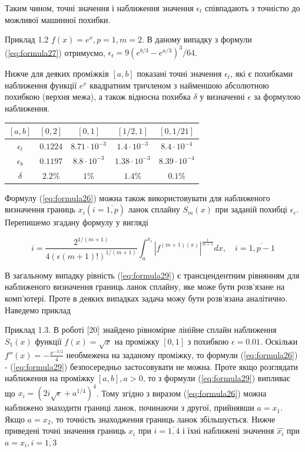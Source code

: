 \documentclass[ukrainian,14pt]{extarticle}
\begin{document}
Таким чином, точні значення і наближення значення $\epsilon_t$ співпадають з точністю до можливої машинної похибки.

\vspace{1cm}

Приклад 1.2 $f(x) = e^x, p = 1, m = 2$. В даному випадку з формули (\ref{eq:formula27}) отримуємо, $\epsilon_t = 9 (e^{b/3} - e^{a/3})^3 / 64$.

Нижче для деяких проміжків $[a, b]$ показані точні значення $\epsilon_t$, які є похибками наближення функції $e^x$ квадратним тричленом з найменшою абсолютною похибкою (верхня межа), а також відносна похибка $\delta$ у визначенні $\epsilon$ за формулою наближення.

\bgroup
\def\arraystretch{1.5}%
\begin{center}
\begin{tabular}{ c | c |
c | c | c }
 $[a, b]$ & $[0,2]$ & $[0,1]$ & $[1/2,1]$ & $[0,1/21]$ \\
 \hline
 $\epsilon_t$ & $0.1224$ & $8.71 \cdot 10^{-3}$ & $1.4 \cdot 10^{-3}$ & $8.4 \cdot 10^{-4}$ \\  
 \hline
  $\epsilon_b$ & $0.1197$ & $8.8 \cdot 10^{-3}$ & $1.38 \cdot 10^{-3}$ & $8.39 \cdot 10^{-4}$\\  
 \hline
 $\delta$ & $2.2\%$ & $1\%$ & $1.4\%$ & $0.1\%$    
\end{tabular}
\end{center}
\egroup

Формулу (\ref{eq:formula26}) можна також використовувати для наближеного визначення границь $x_i (i = \overline{1,p})$ ланок сплайну $S_m(x)$ при заданій похибці $\epsilon_c$. Перепишемо згадану формулу у вигляді

\begin{equation}\label{eq:formula29}
    i = \frac{2^{1/(m+1)}}{4(\epsilon (m+1)!)^{1/(m+1)}} \int_a^{x_i} \left| f^{(m+1) (x)} \right|^{\frac{1}{m+1}} dx, \quad i = \overline{1, p-1}
\end{equation}

В загальному випадку рівність (\ref{eq:formula29}) є трансцендентним рівнянням для наближеного визначення границь ланок сплайну, яке може бути розв'язане на комп'ютері. Проте в деяких випадках задача можу бути розв'язана аналітично. Наведемо приклад

Приклад 1.3. В роботі [20] знайдено рівномірне лінійне сплайн наближення $S_1(x)$ функції $f(x) = \sqrt{x}$ на проміжку $[0,1]$ з похибкою $\epsilon = 0.01$. Оскільки $f''(x) = -\frac{x^{-3/2}}{4}$ необмежена на заданому проміжку, то формули (\ref{eq:formula26}) - (\ref{eq:formula29}) безпосередньо застосовувати не можна. Проте якщо розглядати наближення на проміжку $[a, b], a > 0$, то з формули (\ref{eq:formula29}) випливає що $x_i = (2i \sqrt{\epsilon} + a^{1/4})^{4}$. Тому згідно з виразом (\ref{eq:formula26}) можна наближено знаходити границі ланок, починаючи з другої, прийнявши $a = x_1$. Якщо $a = x_2$, то точність знаходження границь ланок збільшується. Нижче приведені точні значення границь $x_i$ при $i = \overline{1, 4}$ і їхні наближені значення $\hat{x_i}$ при $a = x_i, i = \overline{1,3}$
\end{document}
